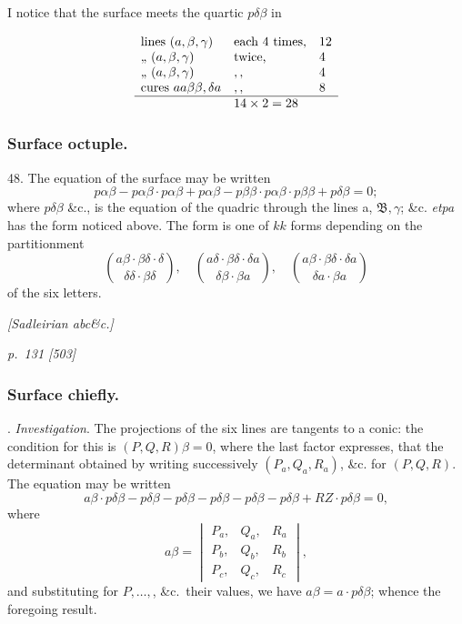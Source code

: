 \documentclass[11pt,a4paper]{book}
\begin{document}
I notice that the surface meets the quartic $p\delta\beta$ in

\[
\begin{array}{lll}
\text{lines}\ (a, \beta, \gamma) & \text{each 4 times,} & 12\\
\text{,, } (a, \beta, \gamma) & \text{twice,} & 4 \\
\text{,, } (a, \beta, \gamma) & ,, & 4\\
\text{cures } a a \beta\beta, \delta a & ,, & 8\\
\hline
& 14 \times 2 = 28
\end{array}
\]

\subsubsection*{Surface octuple.}

48. The equation of the surface may be written
\[
p\alpha\beta - p\alpha\beta\cdot p\alpha\beta + p\alpha\beta - p\beta\beta\cdot p\alpha\beta\cdot p\beta\beta + p\delta\beta = 0;
\]
where $p\delta\beta$ \&c., is the equation of the quadric through the lines a, $\mathfrak{B}, \gamma$; \&c. \textit{etpa}
has the form noticed above.
The form is one of $kk$ forms depending on the partitionment
\[
\binom{a\beta\cdot\beta\delta\cdot\delta}{\delta\delta\cdot\beta\delta}, \quad \binom{a\delta\cdot\beta\delta\cdot\delta a}{\delta\beta\cdot\beta a}, \quad \binom{a\beta\cdot\beta\delta\cdot\delta a}{\delta a\cdot\beta a}
\]
of the six letters.

\textit{[Sadleirian abc\&c.]}

\clearpage

\bigskip
\textit{p.~131 [503]}
\smallskip

\subsubsection*{Surface chiefly.}

. \textit{Investigation}. The projections of the six lines are tangents to a conic: the
condition for this is $(P, Q, R)\beta = 0$, where the last factor expresses, that the determinant
obtained by writing successively $(P_a, Q_a, R_a)$, \&c. for $(P, Q, R)$. The equation may be
written
\[
a\beta\cdot p\delta\beta - p\delta\beta - p\delta\beta - p\delta\beta - p\delta\beta - p\delta\beta + RZ\cdot p\delta\beta = 0,
\]
where
\[
a\beta =
\begin{vmatrix}
P_a, & Q_a, & R_a \\
P_b, & Q_b, & R_b \\
P_c, & Q_c, & R_c
\end{vmatrix},
\]
and substituting for $P, \ldots,$, \&c.\ their values, we have $a\beta = a\cdot p\delta\beta$; whence the foregoing result.
\end{document}

